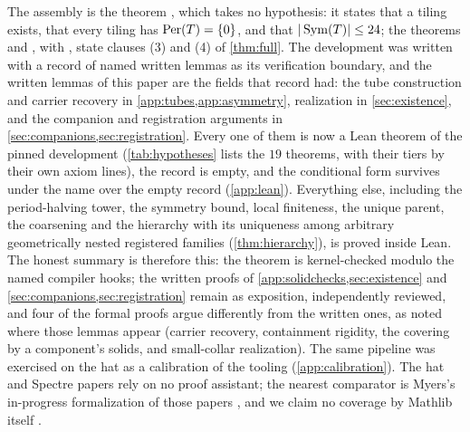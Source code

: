 The assembly is the theorem , which takes no hypothesis: it states that a
tiling exists, that every tiling has $\operatorname{Per}(T)=\{0\}$, and that $|\operatorname{Sym}(T)|\le24$; the theorems
 and , with
, state clauses (3) and (4) of \cref{thm:full}. The
development was written with a record  of named written lemmas as its
verification boundary, and the written lemmas of this paper are the fields that record had: the
tube construction and carrier recovery in \cref{app:tubes,app:asymmetry}, realization in \cref{sec:existence},
and the companion and registration arguments in \cref{sec:companions,sec:registration}. Every one
of them is now a Lean theorem of the pinned development (\cref{tab:hypotheses} lists the $19$
theorems, with their tiers by their own axiom lines), the record is empty, and the conditional
form survives under the name  over the empty record
(\cref{app:lean}). Everything else, including the period-halving tower, the symmetry bound, local
finiteness, the unique parent, the coarsening and the hierarchy with its uniqueness among
arbitrary geometrically nested registered families (\cref{thm:hierarchy}), is proved inside
Lean. The honest summary is therefore this: the theorem is kernel-checked modulo the named
compiler hooks; the written proofs of \cref{app:solidchecks,sec:existence} and
\cref{sec:companions,sec:registration} remain as exposition, independently reviewed, and four of
the formal proofs argue differently from the written ones, as noted where those lemmas appear
(carrier recovery, containment rigidity, the covering by a component's solids, and small-collar
realization). The same pipeline was exercised on the hat as a calibration of the tooling
(\cref{app:calibration}). The hat and Spectre papers rely on no proof assistant; the nearest comparator is Myers's
in-progress formalization of those papers \cite{Mye24lean}, and we claim no coverage by Mathlib
itself \cite{Lean4}.


